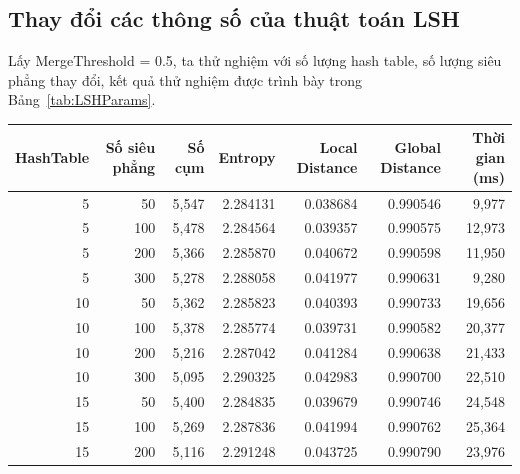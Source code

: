 	\subsection{Thay đổi các thông số của thuật toán LSH}
		Lấy MergeThreshold = 0.5, ta thử nghiệm với số lượng hash table, số lượng siêu phẳng thay đổi, kết quả thử nghiệm được trình bày trong Bảng~\ref{tab:LSHParams}.
		\begin{table}
			\centering
			\setlength\extrarowheight{3pt}
			\begin{tabular}{|r|r|r|r|r|r|r|}
				\hline
				HashTable     & Số siêu phẳng   & Số cụm        & Entropy       & Local Distance & Global Distance & Thời gian (ms) \bigstrut[b]\\			
				\hline
				5             & 50            & 5,547         & 2.284131      & 0.038684      & 0.990546      & 9,977 \bigstrut\\
				\hline
				5             & 100           & 5,478         & 2.284564      & 0.039357      & 0.990575      & 12,973 \bigstrut\\
				\hline
				5             & 200           & 5,366         & 2.285870      & 0.040672      & 0.990598      & 11,950 \bigstrut\\
				\hline
				5             & 300           & 5,278         & 2.288058      & 0.041977      & 0.990631      & 9,280 \bigstrut\\
				\hline
				10            & 50            & 5,362         & 2.285823      & 0.040393      & 0.990733      & 19,656 \bigstrut\\
				\hline
				10            & 100           & 5,378         & 2.285774      & 0.039731      & 0.990582      & 20,377 \bigstrut\\
				\hline
				10            & 200           & 5,216         & 2.287042      & 0.041284      & 0.990638      & 21,433 \bigstrut\\
				\hline
				10            & 300           & 5,095         & 2.290325      & 0.042983      & 0.990700      & 22,510 \bigstrut\\
				\hline
				15            & 50            & 5,400         & 2.284835      & 0.039679      & 0.990746      & 24,548 \bigstrut\\
				\hline
				15            & 100           & 5,269         & 2.287836      & 0.041994      & 0.990762      & 25,364 \bigstrut\\
				\hline
				15            & 200           & 5,116         & 2.291248      & 0.043725      & 0.990790      & 23,976 \bigstrut\\

\end{tabular}
\end{table}
